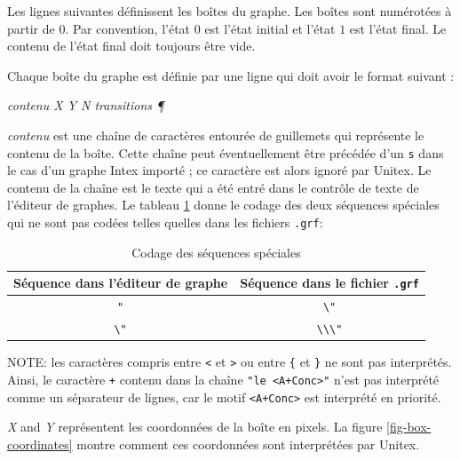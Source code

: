 \bigskip
\noindent Les lignes suivantes définissent les boîtes du graphe. Les boîtes sont numérotées à partir
de $0$. Par convention, l’état $0$ est l’état initial et l’état $1$ est l’état final. Le contenu de
l’état final doit toujours être vide.


\bigskip
\noindent Chaque boîte du graphe est définie par une ligne qui doit avoir le format suivant :

\bigskip
\textit{contenu X Y N transitions \P}

\bigskip
\noindent \textit{contenu} est une chaîne de caractères entourée de guillemets qui représente le contenu de la boîte. Cette chaîne peut éventuellement être précédée d’un \verb+s+                                                                        dans le cas d’un graphe Intex importé ; ce caractère est alors ignoré par Unitex. Le contenu de la chaîne est le texte qui a été entré dans le contrôle de texte de l’éditeur de graphes. Le tableau
\ref{table10-2} donne le codage des deux séquences spéciales qui ne sont pas codées telles quelles dans les fichiers \verb+.grf+:

\bigskip
\begin{table}[!ht]
\begin{center}
\begin{tabular}{|c|c|}
\hline
Séquence dans l’éditeur de graphe & Séquence dans le fichier \verb+.grf+
\\
\hline
\verb$"$ & \verb$\"$
\\
\hline
\verb$\"$ & \verb$\\\"$
\\
\hline
\end{tabular}
\caption{Codage des séquences spéciales\label{table10-2}}
\end{center}
\end{table}

\bigskip
\noindent NOTE: les caractères compris entre \verb+<+ et \verb+>+ ou entre \verb+{+ et \verb+}+ ne
sont pas interprétés. Ainsi, le caractère \verb$+$ contenu dans la chaîne \verb$"le <A+Conc>"$ n’est
pas interprété comme un séparateur de lignes, car le motif \verb$<A+Conc>$ est interprété en
priorité.

\bigskip
\noindent \textit{X} and \textit{Y} représentent les coordonnées de la boîte en pixels. La figure
\ref{fig-box-coordinates} montre comment ces coordonnées sont interprétées par Unitex.



